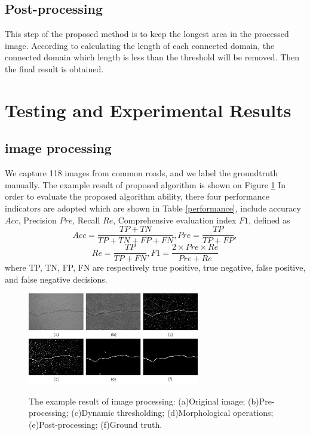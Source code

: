 \documentclass[twocolumn]{article}
\begin{document}
        \subsection{Post-processing}
        This step of the proposed method is to keep the longest area in the processed image. According to calculating the length of each connected domain, the connected domain which length is less than 
        the threshold will be removed. Then the final result is obtained.\\ 

    \section{Testing and Experimental Results}  
        \subsection{image processing}
        We capture 118 images from common roads, and we label the groundtruth manually. The example result of proposed algorithm is shown on Figure \ref{Result of image processing}
        In order to evaluate the proposed algorithm ability, there four performance indicators are adopted which are shown in Table \ref{performance}, 
        include accuracy $Acc$, Precision $Pre$, Recall $Re$, Comprehensive evaluation index $F1$, defined as
        $$Acc=\frac{TP+TN}{TP+TN+FP+FN}, Pre=\frac{TP}{TP+FP},$$
        $$Re=\frac{TP}{TP+FN}, F1=\frac{2\times Pre\times Re}{Pre+Re}$$
        where TP, TN, FP, FN are respectively true positive, true negative, false positive, and false negative decisions.\\

        \begin{figure}[h]
            \centering
            \includegraphics[width=7.5cm]{image//Result_image.png}\\
            \caption{The example result of image processing: (a)Original image; (b)Pre-processing; (c)Dynamic thresholding; (d)Morphological operations; (e)Post-processing; (f)Ground truth.}\label{Result of image processing}
            \end{figure}
        
\end{document}
